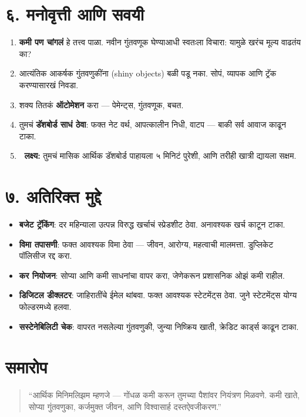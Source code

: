 \section*{६. मनोवृत्ती आणि सवयी}
\begin{enumerate}
\item \textbf{कमी पण चांगलं} हे तत्त्व पाळा.  
नवीन गुंतवणूक घेण्याआधी स्वतःला विचारा:  
यामुळे खरंच मूल्य वाढतंय का?  

\item आत्यंतिक आकर्षक गुंतवणुकींना (shiny objects) बळी पडू नका.  
सोपं, व्यापक आणि ट्रॅक करण्यासारखं निवडा.  

\item शक्य तितकं \textbf{ऑटोमेशन} करा — पेमेन्ट्स, गुंतवणूक, बचत.  

\item तुमचं \textbf{डॅशबोर्ड साधं ठेवा}:  
फक्त नेट वर्थ, आपत्कालीन निधी, वाटप —  
बाकी सर्व आवाज काढून टाका.  

\item 🎯 \textbf{लक्ष्य:} तुमचं मासिक आर्थिक डॅशबोर्ड पाहायला ५ मिनिटं पुरेशी,  
आणि तरीही खात्री द्यायला सक्षम.  
\end{enumerate}


\section*{७. अतिरिक्त मुद्दे}
\begin{itemize}
\item \textbf{बजेट ट्रॅकिंग}:  
दर महिन्याला उत्पन्न विरुद्ध खर्चाचं स्प्रेडशीट ठेवा.  
अनावश्यक खर्च काटून टाका.  

\item \textbf{विमा तपासणी}:  
फक्त आवश्यक विमा ठेवा — जीवन, आरोग्य, महत्वाची मालमत्ता.  
डुप्लिकेट पॉलिसीज रद्द करा.  

\item \textbf{कर नियोजन}:  
सोप्या आणि कमी साधनांचा वापर करा,  
जेणेकरून प्रशासनिक ओझं कमी राहील.  

\item \textbf{डिजिटल डीक्लटर}:  
जाहिरातींचे ईमेल थांबवा.  
फक्त आवश्यक स्टेटमेंट्स ठेवा.  
जुने स्टेटमेंट्स योग्य फोल्डरमध्ये हलवा.  

\item \textbf{सस्टेनेबिलिटी चेक}:  
वापरत नसलेल्या गुंतवणुकी,  
जुन्या निष्क्रिय खाती, क्रेडिट कार्ड्स काढून टाका.  
\end{itemize}


\section*{समारोप}
\begin{quote}
“आर्थिक मिनिमलिझम म्हणजे —  
गोंधळ कमी करून तुमच्या पैशांवर नियंत्रण मिळवणे.  
कमी खाते, सोप्या गुंतवणुका, कर्जमुक्त जीवन,  
आणि विश्वासार्ह दस्तऐवजीकरण.”  
\end{quote}


